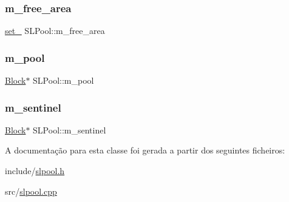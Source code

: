 \subsubsection{\texorpdfstring{m\+\_\+free\+\_\+area}{m\_free\_area}}
{\footnotesize\ttfamily \hyperlink{classSLPool_a56a9012819984d5c7dcdd768482a5d37}{set\+\_\+} S\+L\+Pool\+::m\+\_\+free\+\_\+area\hspace{0.3cm}{\ttfamily [private]}}

\mbox{\label{classSLPool_a7612411c05e5dd1fa06e612e7ffddca3}} 
\subsubsection{\texorpdfstring{m\+\_\+pool}{m\_pool}}
{\footnotesize\ttfamily \hyperlink{structSLPool_1_1Block}{Block}$\ast$ S\+L\+Pool\+::m\+\_\+pool\hspace{0.3cm}{\ttfamily [private]}}

\mbox{\label{classSLPool_a2c72962a10ee6bc7699602b5b79e775e}} 
\subsubsection{\texorpdfstring{m\+\_\+sentinel}{m\_sentinel}}
{\footnotesize\ttfamily \hyperlink{structSLPool_1_1Block}{Block}$\ast$ S\+L\+Pool\+::m\+\_\+sentinel\hspace{0.3cm}{\ttfamily [private]}}



A documentação para esta classe foi gerada a partir dos seguintes ficheiros\+:\begin{DoxyCompactItemize}
\item 
include/\hyperlink{slpool_8h}{slpool.\+h}\item 
src/\hyperlink{slpool_8cpp}{slpool.\+cpp}\end{DoxyCompactItemize}
